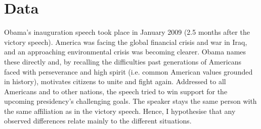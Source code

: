 \documentclass[11pt]{article}
\begin{document}
\section{Data}{
	Obama's inauguration speech took place in January 2009 (2.5 months after the victory speech).
	America was facing the global financial crisis and war in Iraq, and an approaching environmental crisis was becoming clearer.
	Obama names these directly and, by recalling the difficulties past generations of Americans faced with perseverance and high spirit (i.e. common American values grounded in history), 
	motivates citizens to unite and fight again.
	Addressed to all Americans and to other nations, the speech tried to win support for the upcoming presidency's challenging goals.
	The speaker stays the same person with the same affiliation as in the victory speech. Hence, I hypothesise that any observed differences relate mainly to the different situations.

}

\end{document}
